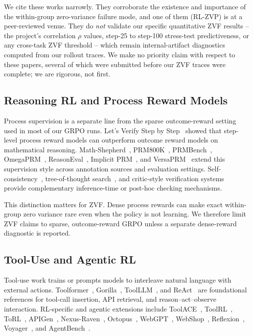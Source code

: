 We cite these works narrowly. They corroborate the existence and importance of
the within-group zero-variance failure mode, and one of them (RL-ZVP) is at a
peer-reviewed venue. They do \emph{not} validate our specific quantitative
ZVF results -- the project's correlation $\rho$ values, step-25 to step-100
stress-test predictiveness, or any cross-task ZVF threshold -- which remain
internal-artifact diagnostics computed from our rollout traces. We make no
priority claim with respect to these papers, several of which were submitted
before our ZVF traces were complete; we are rigorous, not first.

\subsection{Reasoning RL and Process Reward Models}
\label{sec:related:reasoning}

Process supervision is a separate line from the sparse outcome-reward setting
used in most of our GRPO runs. Let's Verify Step by Step~\cite{lightman2024stepbystep}
showed that step-level process reward models can outperform outcome reward
models on mathematical reasoning. Math-Shepherd~\cite{wang2024mathshepherd},
PRM800K~\cite{uesato2022prm800k}, PRMBench~\cite{song2024prmbench},
OmegaPRM~\cite{luo2024omegaprm}, ReasonEval~\cite{xia2024reasoneval},
Implicit PRM~\cite{yuan2024implicitprm}, and VersaPRM~\cite{yuan2025versaprm}
extend this supervision style across annotation sources and evaluation
settings. Self-consistency~\cite{wang2023selfconsistency},
tree-of-thought search~\cite{yao2024tot}, and critic-style verification
systems~\cite{mcaleese2024criticgpt} provide complementary inference-time or
post-hoc checking mechanisms.

This distinction matters for ZVF. Dense process rewards can make exact
within-group zero variance rare even when the policy is not learning. We
therefore limit ZVF claims to sparse, outcome-reward GRPO unless a separate
dense-reward diagnostic is reported.

\subsection{Tool-Use and Agentic RL}
\label{sec:related:tooluse}

Tool-use work trains or prompts models to interleave natural language with
external actions. Toolformer~\cite{schick2023toolformer}, Gorilla~\cite{patil2023gorilla},
ToolLLM~\cite{qin2024toolllm}, and ReAct~\cite{yao2023react} are foundational
references for tool-call insertion, API retrieval, and reason--act--observe
interaction. RL-specific and agentic extensions include
ToolACE~\cite{liu2024toolace}, ToolRL~\cite{qian2025toolrl},
ToRL~\cite{li2025torl}, APIGen~\cite{lin2024apigen},
Nexus-Raven~\cite{nexusflow2024nexusraven}, Octopus~\cite{chen2024octopus},
WebGPT~\cite{nakano2021webgpt}, WebShop~\cite{yao2022webshop},
Reflexion~\cite{shinn2023reflexion}, Voyager~\cite{wang2023voyager}, and
AgentBench~\cite{liu2024agentbench}.

